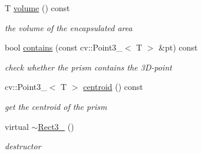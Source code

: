 \begin{DoxyCompactItemize}
\-T \hyperlink{classRect3___a766842fae2533d47ccf9b7fb428670c8}{volume} () const 
\begin{DoxyCompactList}\small\item\em the volume of the encapsulated area \end{DoxyCompactList}\item 
bool \hyperlink{classRect3___ad9928349a9a8bca8f98a1bf1cab676e9}{contains} (const cv\-::\-Point3\-\_\-$<$ \-T $>$ \&pt) const 
\begin{DoxyCompactList}\small\item\em check whether the prism contains the 3\-D-\/point \end{DoxyCompactList}\item 
cv\-::\-Point3\-\_\-$<$ \-T $>$ \hyperlink{classRect3___addafb9e6380c9a3ffd4f394d311c59b6}{centroid} () const 
\begin{DoxyCompactList}\small\item\em get the centroid of the prism \end{DoxyCompactList}\item 
virtual \hyperlink{classRect3___a297683142c5197991bfaabdb2305a37c}{$\sim$\-Rect3\-\_\-} ()
\begin{DoxyCompactList}\small\item\em destructor \end{DoxyCompactList}\end{DoxyCompactItemize}
